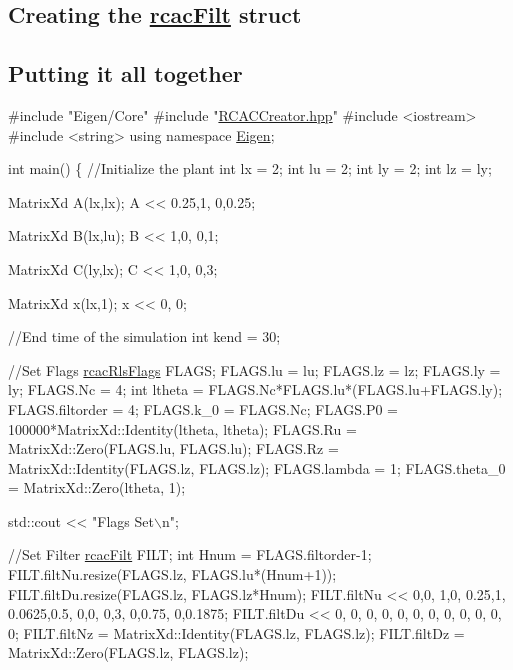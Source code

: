 \subsection*{Creating the \hyperlink{structrcac_filt}{rcac\+Filt} struct }

\subsection*{Putting it all together }


\begin{DoxyCode}
\textcolor{preprocessor}{#include "Eigen/Core"}
\textcolor{preprocessor}{#include "\hyperlink{_r_c_a_c_creator_8hpp}{RCACCreator.hpp}"}
\textcolor{preprocessor}{#include <iostream>}
\textcolor{preprocessor}{#include <string>}
\textcolor{keyword}{using namespace }\hyperlink{namespace_eigen}{Eigen};

\textcolor{keywordtype}{int} main()
\{
    \textcolor{comment}{//Initialize the plant}
    \textcolor{keywordtype}{int} lx = 2;
    \textcolor{keywordtype}{int} lu = 2;
    \textcolor{keywordtype}{int} ly = 2;
    \textcolor{keywordtype}{int} lz = ly;

    MatrixXd A(lx,lx);
    A << 0.25,1,
          0,0.25;

    MatrixXd B(lx,lu);
    B << 1,0,
         0,1;

    MatrixXd C(ly,lx);
    C << 1,0,
         0,3;

    MatrixXd x(lx,1);
    x << 0,
         0;

    \textcolor{comment}{//End time of the simulation}
    \textcolor{keywordtype}{int} kend = 30;

    \textcolor{comment}{//Set Flags}
    \hyperlink{structrcac_rls_flags}{rcacRlsFlags} FLAGS;
    FLAGS.lu = lu;
    FLAGS.lz = lz;
    FLAGS.ly = ly;
    FLAGS.Nc = 4;
    \textcolor{keywordtype}{int} ltheta = FLAGS.Nc*FLAGS.lu*(FLAGS.lu+FLAGS.ly);
    FLAGS.filtorder = 4;
    FLAGS.k\_0 = FLAGS.Nc;
    FLAGS.P0 = 100000*MatrixXd::Identity(ltheta, ltheta);
    FLAGS.Ru = MatrixXd::Zero(FLAGS.lu, FLAGS.lu);
    FLAGS.Rz = MatrixXd::Identity(FLAGS.lz, FLAGS.lz);
    FLAGS.lambda = 1;
    FLAGS.theta\_0 = MatrixXd::Zero(ltheta, 1);

    std::cout << \textcolor{stringliteral}{"Flags Set\(\backslash\)n"}; 

    \textcolor{comment}{//Set Filter}
    \hyperlink{structrcac_filt}{rcacFilt} FILT;
    \textcolor{keywordtype}{int} Hnum = FLAGS.filtorder-1;
    FILT.filtNu.resize(FLAGS.lz, FLAGS.lu*(Hnum+1));
    FILT.filtDu.resize(FLAGS.lz, FLAGS.lz*Hnum);
    FILT.filtNu << 0,0, 1,0, 0.25,1, 0.0625,0.5,
                   0,0, 0,3, 0,0.75, 0,0.1875; 
    FILT.filtDu << 0, 0, 0, 0, 0, 0,
                   0, 0, 0, 0, 0, 0;
    FILT.filtNz = MatrixXd::Identity(FLAGS.lz, FLAGS.lz);
    FILT.filtDz =  MatrixXd::Zero(FLAGS.lz, FLAGS.lz);


\end{DoxyCode}
